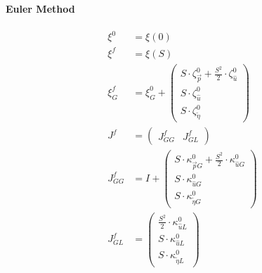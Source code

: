 \documentclass[review]{elsarticle}
\begin{document}
\paragraph{Euler Method}
\begin{equation} \begin{alignedat}{-1}
    \xi^{0}&=\xi\left(0\right) \\
    \xi^{f}&=\xi\left(S\right) \\
    \xi_{G}^{f}&=\xi_{G}^{0}+\left(\begin{array}{l}
        S\cdot\zeta_{\vec{p}}^{0}+\frac{S^{2}}{2}\cdot\zeta_{\hat{u}}^{0}\\
        S\cdot\zeta_{\hat{u}}^{0}\\
        S\cdot\zeta_{\tilde{\eta}}^{0}
    \end{array}\right) \\
    J^{f}&=\left(\begin{array}{cc}
        J_{GG}^{f} & J_{GL}^{f}
    \end{array}\right) \\
    J_{GG}^{f}&=I+\left(\begin{array}{l}
        S\cdot\kappa_{\vec{p}G}^{0}+\frac{S^{2}}{2}\cdot\kappa_{\hat{u}G}^{0}\\
        S\cdot\kappa_{\hat{u}G}^{0}\\
        S\cdot\kappa_{\tilde{\eta}G}^{0}
    \end{array}\right) \\
    J_{GL}^{f}&=\left(\begin{array}{l}
        \frac{S^{2}}{2}\cdot\kappa_{\hat{u}L}^{0}\\
        S\cdot\kappa_{\hat{u}L}^{0}\\
        S\cdot\kappa_{\tilde{\eta}L}^{0}
    \end{array}\right) \\
\end{alignedat} \end{equation} 
\end{document}
